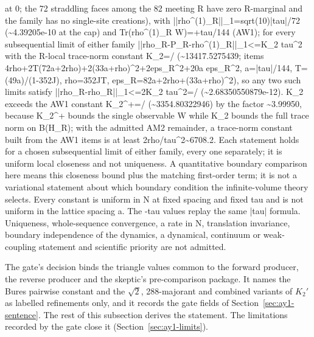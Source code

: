 \begin{gatequote}
at 0; the 72 straddling faces among the 82 meeting R have zero R-marginal and
the family has no single-site creations), with
||rho\textasciicircum{}(1)\_R||\_1=sqrt(10)|tau|/72
(\textasciitilde{}4.39205e-10 at the cap) and Tr(rho\textasciicircum{}(1)\_R
W)=+tau/144 (AW1); for every subsequential limit of either family
||rho\_R-P\_R-rho\textasciicircum{}(1)\_R||\_1<=K\_2\textquotesingle{}
tau\textasciicircum{}2 with the R-local trace-norm constant
K\_2\textquotesingle{}=/
(\textasciitilde{}13417.5275439; items
4rho+2T(72a+2rho)+2(33a+rho)\textasciicircum{}2+2eps\_R\textasciicircum{}2+20a
eps\_R\textasciicircum{}2, a=|tau|/144, T=(49a)/(1-352J), rho=352JT,
eps\_R=82a+2rho+(33a+rho)\textasciicircum{}2), so any two such limits satisfy
||rho\_R-rho\textquotesingle{}\_R||\_1<=2K\_2\textquotesingle{}
tau\textasciicircum{}2=/
(\textasciitilde{}2.68350550879e-12). K\_2\textquotesingle{} exceeds the AW1
constant K\_2\textasciicircum{}+=/ (\textasciitilde{}3354.80322946) by
the factor \textasciitilde{}3.99950, because K\_2\textasciicircum{}+ bounds
the single observable W while K\_2\textquotesingle{} bounds the full trace
norm on B(H\_R); with the admitted AM2 remainder, a trace-norm constant built
from the AW1 items is at least
2rho/tau\textasciicircum{}2\textasciitilde{}6708.2. Each statement holds for a
chosen subsequential limit of either family, every one separately; it is
uniform local closeness and not uniqueness. A quantitative boundary comparison
here means this closeness bound plus the matching first-order term; it is not
a variational statement about which boundary condition the infinite-volume
theory selects. Every constant is uniform in N at fixed spacing and fixed tau
and is not uniform in the lattice spacing a. The -tau values replay the same
|tau| formula. Uniqueness, whole-sequence convergence, a rate in N,
translation invariance, boundary independence of the dynamics, a dynamical,
continuum or weak-coupling statement and scientific priority are not admitted.
\end{gatequote}
The gate's decision binds the triangle values common to the forward
producer, the reverse producer and the skeptic's pre-comparison package. It
names the Bures pairwise constant and the $\sqrt2$, 288-majorant and combined
variants of $K_2'$ as labelled refinements only, and it records the gate
fields of Section~\ref{sec:ay1-sentence}. The rest of this subsection derives
the statement. The limitations recorded by the gate close it
(Section~\ref{sec:ay1-limits}).

